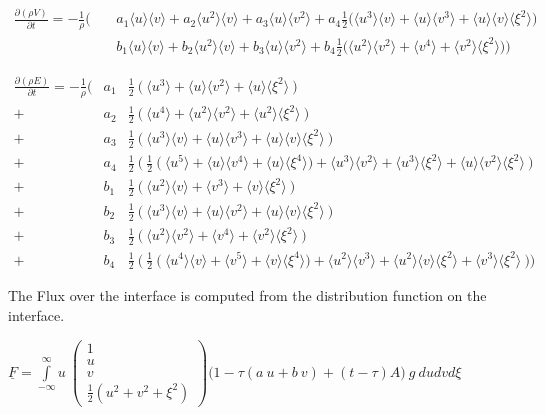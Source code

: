 \documentclass[
	pdftex,             %
	12pt,				%
	a4paper,		   	%
	english,				%
	oneside,			%
]{article}
\newcommand{\mom}[1]{\langle #1 \rangle}
\newcommand{\uu}[1]{\underline{#1}}
\begin{document}
\begin{eqnarray*}
\frac{\partial (\rho V)}{\partial t}
=
-\frac{1}{\rho}
\Bigg(
&~&a_1 \mom{u}\mom{v} + a_2 \mom{u^2}\mom{v} + a_3 \mom{u}\mom{v^2}
+  a_4 \frac{1}{2} \Big( \mom{u^3}\mom{v} + \mom{u}\mom{v^3} + \mom{u}\mom{v}\mom{\xi^2} \Big)
\\
&~&b_1 \mom{u}\mom{v} + b_2 \mom{u^2}\mom{v} + b_3 \mom{u}\mom{v^2}
+  b_4 \frac{1}{2} \Big( \mom{u^2}\mom{v^2} + \mom{v^4} + \mom{v^2}\mom{\xi^2} \Big)
\Bigg)
\end{eqnarray*}

\begin{eqnarray*}
\frac{\partial (\rho E)}{\partial t}
=
-\frac{1}{\rho}
\Bigg(
 &a_1& \frac{1}{2}~ \Big(~ \mom{u^3} + \mom{u}\mom{v^2} + \mom{u}\mom{\xi^2} ~\Big) \\
+&a_2& \frac{1}{2}~ \Big(~ \mom{u^4} + \mom{u^2}\mom{v^2} + \mom{u^2}\mom{\xi^2} ~\Big) \\
+&a_3& \frac{1}{2}~ \Big(~ \mom{u^3}\mom{v} + \mom{u}\mom{v^3} + \mom{u}\mom{v}\mom{\xi^2} ~\Big) \\
+&a_4& \frac{1}{2}~ \Big(~ \frac{1}{2}~
					\big(~ \mom{u^5} + \mom{u}\mom{v^4} + \mom{u}\mom{\xi^4} \big)
						 + \mom{u^3}\mom{v^2} + \mom{u^3}\mom{\xi^2} + \mom{u}\mom{v^2}\mom{\xi^2}
					~\Big)
\\
+&b_1& \frac{1}{2}~ \Big(~ \mom{u^2}\mom{v} + \mom{v^3} + \mom{v}\mom{\xi^2} ~\Big) \\
+&b_2& \frac{1}{2}~ \Big(~ \mom{u^3}\mom{v} + \mom{u}\mom{v^2} + \mom{u}\mom{v}\mom{\xi^2} ~\Big) \\
+&b_3& \frac{1}{2}~ \Big(~ \mom{u^2}\mom{v^2} + \mom{v^4} + \mom{v^2}\mom{\xi^2} ~\Big) \\
+&b_4& \frac{1}{2}~ \Big(~ \frac{1}{2}~
					\big(~  \mom{u^4}\mom{v} +\mom{v^5} + \mom{v}\mom{\xi^4} \big)
						 + \mom{u^2}\mom{v^3} + \mom{u^2}\mom{v}\mom{\xi^2} + \mom{v^3}\mom{\xi^2}
					~\Big)
\Bigg)
\end{eqnarray*}

\clearpage

The Flux over the interface is computed from the distribution function on the interface. 

\begin{math}
\uu{F} = 
\int \limits_{-\infty}^{\infty}
u~
\begin{pmatrix}
	1 \\ u \\ v \\ \frac{1}{2} (u^2 + v^2 + \xi^2)
\end{pmatrix}
\Big(
	1 - \tau (a~u + b~v) + (t-\tau)A
\Big)
~g~ du dv d\xi
\end{math}
\end{document}
